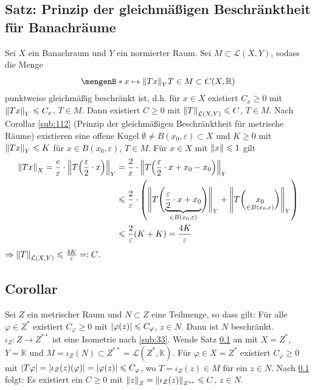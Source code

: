 \subsection{Satz: Prinzip der gleichmäßigen Beschränktheit für Banachräume} %
\label{sub:35}
Sei $X$ ein Banachraum und $Y$ ein normierter Raum. Sei $M \subset \mathcal{L}(X,Y)$, sodass die Menge 
\[
	\set[{x \mapsto \norm[Y]{T x}}]{T \in M \rule{0cm}{1em}} \subset C(X,\mathds{R} )
\]
punktweise gleichmäßig beschränkt ist, d.h. für $x \in X$ existiert $C_x \ge 0$ mit $\norm[Y]{T x} \le C_x$, $T \in M$. Dann existiert $C \ge 0$ mit $\norm[\mathcal{L}(X,Y)]{T} \le C$,
$T \in M$.
Nach Corollar \ref{sub:112} (Prinzip der gleichmäßigen Beschränktheit für metrische Räume) existieren eine offene Kugel $\emptyset \not= B(x_0,\varepsilon) \subset X$ und 
$K \ge 0$ mit $\norm[Y]{T x} \le K$ für $x \in B(x_0, \varepsilon)$, $T \in M$. Für $x \in X$ mit $\norm{x} \le 1$ gilt 
\begin{align*}
	\norm[X]{T x} = \frac{e}{\varepsilon} \cdot  \norm[Y]{T \enbrace*{\frac{\varepsilon}{2} \cdot x}} &= \frac{2}{\varepsilon} \cdot 
	\norm[Y]{T \enbrace*{\frac{\varepsilon}{2} \cdot x + x_0 - x_0 } }  \\
	&\le \frac{2}{\varepsilon} \cdot   \enbrace*{ \doppelstrich[\Bigg]{T \enbrace[\Bigg]{\underbrace{\frac{\varepsilon}{2} \cdot x + x_0}_{\in B(x_0,\varepsilon)} } }_Y +
	 \norm[Y]{T  \enbrace[\bigg]{\underset{\in B(x_0,\varepsilon)}{x_0}} }} \\
	&\le \frac{2}{\varepsilon} (K+K) = \frac{4K}{\varepsilon}   
\end{align*}
$\Rightarrow \norm[\mathcal{L}(X,Y)]{T} \le \frac{4 K}{\varepsilon} =: C$. \bewende

\subsection{Corollar} %
\label{sub:36}
Sei $Z$ ein metrischer Raum und $N \subset Z$ eine Teilmenge, so dass gilt: Für alle $\varphi \in Z^*$ existiert $C_\varphi \ge 0$ mit $\abs*{\varphi(z)} \le C_\varphi$, 
$z \in N$.  Dann ist $N$ beschränkt.
$\iota_Z : Z \to Z^{**}$ ist eine Isometrie nach \ref{sub:33}. Wende Satz \ref{sub:35} an mit $X=Z^{*}$, $Y=\mathds{K}$ und 
$M = \iota_Z(N) \subset Z^{**}= \mathcal{L}(Z^*,\mathds{K})$.
Für $\varphi \in X = Z^{*}$ existiert $C_\varphi \ge 0$ mit $\abs*{T \varphi} = \abs*{\iota_Z(z) (\varphi)} = \abs*{\varphi(z)} \le C_\varphi$, wo $T= \iota_Z(z) \in M$
für ein $z \in N$. Nach \ref{sub:35} folgt: Es existiert ein $C \ge 0$ mit $\norm[Z]{z} = \norm[Z^{**}]{\iota_Z(z)}  \le C$, $z \in N$. \bewende

